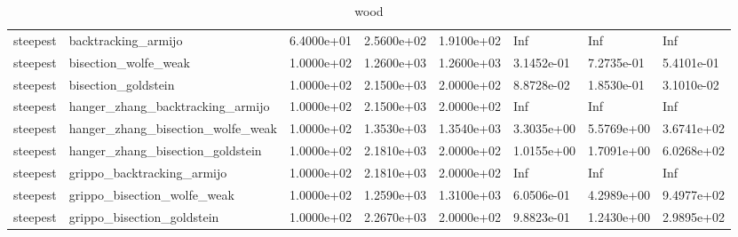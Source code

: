 \documentclass[a4paper,11pt]{article}
\numberwithin{equation}{section} %
\begin{document}
\begin{table}[h!]
{\begin{tabular}{|l|l|l|l|l|l|l|l|}
        steepest & backtracking\_armijo & 6.4000e+01 & 2.5600e+02 & 1.9100e+02 & Inf & Inf & Inf \\
        steepest & bisection\_wolfe\_weak & 1.0000e+02 & 1.2600e+03 & 1.2600e+03 & 3.1452e-01 & 7.2735e-01 & 5.4101e-01 \\
        steepest & bisection\_goldstein & 1.0000e+02 & 2.1500e+03 & 2.0000e+02 & 8.8728e-02 & 1.8530e-01 & 3.1010e-02 \\
        steepest & hanger\_zhang\_backtracking\_armijo & 1.0000e+02 & 2.1500e+03 & 2.0000e+02 & Inf & Inf & Inf \\
        steepest & hanger\_zhang\_bisection\_wolfe\_weak & 1.0000e+02 & 1.3530e+03 & 1.3540e+03 & 3.3035e+00 & 5.5769e+00 & 3.6741e+02 \\
        steepest & hanger\_zhang\_bisection\_goldstein & 1.0000e+02 & 2.1810e+03 & 2.0000e+02 & 1.0155e+00 & 1.7091e+00 & 6.0268e+02 \\
        steepest & grippo\_backtracking\_armijo & 1.0000e+02 & 2.1810e+03 & 2.0000e+02 & Inf & Inf & Inf \\
        steepest & grippo\_bisection\_wolfe\_weak & 1.0000e+02 & 1.2590e+03 & 1.3100e+03 & 6.0506e-01 & 4.2989e+00 & 9.4977e+02 \\
        steepest & grippo\_bisection\_goldstein & 1.0000e+02 & 2.2670e+03 & 2.0000e+02 & 9.8823e-01 & 1.2430e+00 & 2.9895e+02 \\

\end{tabular}}
\caption{wood}
\label{table:wood}
\end{table}
\end{document}
